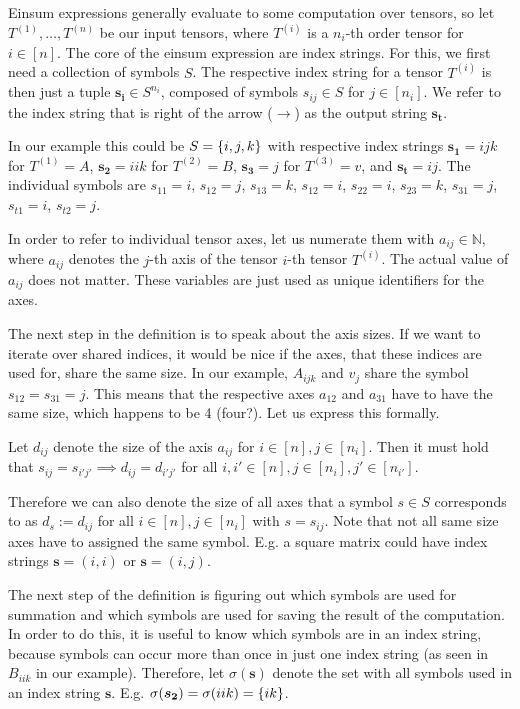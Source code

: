 \begin{definition}
    Einsum expressions generally evaluate to some computation over tensors, so let $T^{(1)},\dots,T^{(n)}$ be our input tensors,
    where $T^{(i)}$ is a $n_i$-th order tensor for $i \in [n]$.
    The core of the einsum expression are index strings. For this, we first need a collection of symbols $S$.
    The respective index string for a tensor $T^{(i)}$ is then just a tuple $\bm{s_i} \in S^{n_i}$,
    composed of symbols $s_{ij} \in S$ for $j \in [n_i]$.
    We refer to the index string that is right of the arrow ($\rightarrow$) as the output string $\bm{s_t}$.

    In our example this could be $S = \lbrace i,j,k \rbrace$ with respective index strings
    $\bm{s_1} = ijk$ for $T^{(1)} = A$,
    $\bm{s_2} = iik$ for $T^{(2)} = B$,
    $\bm{s_3} = j$ for $T^{(3)} = v$,
    and $\bm{s_t} = ij$.
    The individual symbols are $s_{11} = i$, $s_{12} = j$, $s_{13} = k$, $s_{12} = i$, $s_{22} = i$, $s_{23} = k$, $s_{31} = j$, $s_{t1} = i$, $s_{t2} = j$.

    In order to refer to individual tensor axes, let us numerate them with $a_{ij} \in \mathbb{N}$,
    where $a_{ij}$ denotes the $j$-th axis of the tensor $i$-th tensor $T^{(i)}$.
    The actual value of $a_{ij}$ does not matter.
    These variables are just used as unique identifiers for the axes.

    The next step in the definition is to speak about the axis sizes.
    If we want to iterate over shared indices, it would be nice if the axes, that these indices are used for, share the same size.
    In our example, $A_{ijk}$ and $v_j$ share the symbol $s_{12} = s_{31} = j$.
    This means that the respective axes $a_{12}$ and $a_{31}$ have to have the same size, which happens to be 4 (four?).
    Let us express this formally.

    Let $d_{ij}$ denote the size of the axis $a_{ij}$ for $i \in [n], j \in [n_i]$.
    Then it must hold that $s_{ij} = s_{i'j'} \implies d_{ij} = d_{i'j'}$ for all $i,i' \in [n], j \in [n_i], j' \in [n_{i'}]$.

    Therefore we can also denote the size of all axes that a symbol $s \in S$ corresponds to as $d_s := d_{ij}$ for all $i \in [n], j \in [n_i]$ with $s = s_{ij}$.
    Note that not all same size axes have to assigned the same symbol. E.g. a square matrix could have index strings $\bm{s} = (i, i)$ or $\bm{s} = (i, j)$.

    The next step of the definition is figuring out which symbols are used for summation and which symbols are used for saving the result of the computation.
    In order to do this, it is useful to know which symbols are in an index string, because symbols can occur more than once in just one index string (as seen in $B_{iik}$ in our example).
    Therefore, let $\sigma(\bm{s})$ denote the set with all symbols used in an index string $\bm{s}$.
    E.g. $\sigma(\bm{s_2}) = \sigma(iik) = \lbrace ik \rbrace$.


\end{definition}
